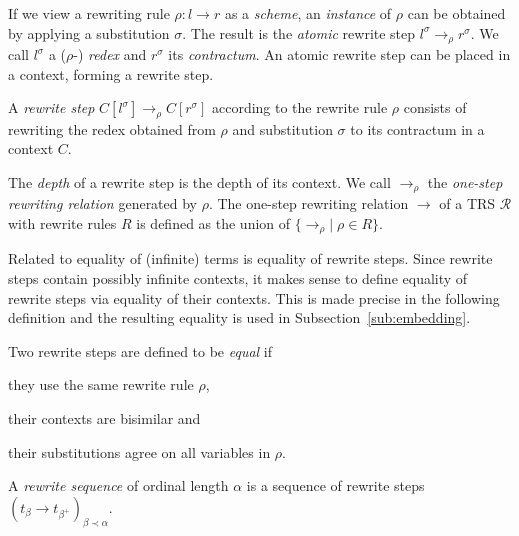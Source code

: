 If we view a rewriting rule $\rho : l \rightarrow r$ as a \emph{scheme}, an
\emph{instance} of $\rho$ can be obtained by applying a substitution
$\sigma$. The result is the \emph{atomic} rewrite step $l^\sigma
\rightarrow_\rho r^\sigma$. We call $l^\sigma$ a ($\rho$-) \emph{redex} and
$r^\sigma$ its \emph{contractum}. An atomic rewrite step can be placed in a
context, forming a rewrite step.

\begin{definition}%
A \emph{rewrite step} $C[l^\sigma] \rightarrow_\rho C[r^\sigma]$ according to
the rewrite rule $\rho$ consists of rewriting the redex obtained from
$\rho$ and substitution $\sigma$ to its contractum in a context $C$.
\end{definition}

The \emph{depth} of a rewrite step is the depth of its context. We
call $\rightarrow_\rho$ the \emph{one-step rewriting relation}
generated by $\rho$. The one-step rewriting relation $\rightarrow$ of
a TRS $\mathcal{R}$ with rewrite rules $R$ is defined as the union of
$\{ \rightarrow_\rho | \; \rho \in R \}$.


Related to equality of (infinite) terms is equality of rewrite
steps. Since rewrite steps contain possibly infinite contexts, it
makes sense to define equality of rewrite steps via equality of their
contexts. This is made precise in the following definition and the
resulting equality is used in Subsection~\ref{sub:embedding}.

\begin{definition}\label{def:stepeq}%
Two rewrite steps are defined to be \emph{equal} if
\begin{compactenum}
  \item they use the same rewrite rule $\rho$,
  \item their contexts are bisimilar and
  \item their substitutions agree on all variables in $\rho$.
\end{compactenum}
\end{definition}

\begin{definition}\label{def:seq}%
A \emph{rewrite sequence} of ordinal length $\alpha$ is a sequence of rewrite
steps $(t_\beta \rightarrow t_{\beta^+})_{\beta \prec \alpha}$.
\end{definition}

